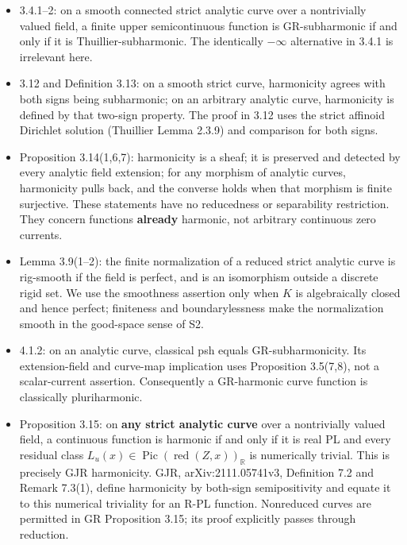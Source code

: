 \documentclass[
  11pt,
]{article}
\providecommand{\tightlist}{%
  \setlength{\itemsep}{0pt}\setlength{\parskip}{0pt}}
\begin{document}
\begin{itemize}
\tightlist
\item
  3.4.1--2: on a smooth connected strict analytic curve over a
  nontrivially valued field, a finite upper semicontinuous function is
  GR-subharmonic if and only if it is Thuillier-subharmonic. The
  identically \(-\infty\) alternative in 3.4.1 is irrelevant here.
\item
  3.12 and Definition 3.13: on a smooth strict curve, harmonicity agrees
  with both signs being subharmonic; on an arbitrary analytic curve,
  harmonicity is defined by that two-sign property. The proof in 3.12
  uses the strict affinoid Dirichlet solution (Thuillier Lemma 2.3.9)
  and comparison for both signs.
\item
  Proposition 3.14(1,6,7): harmonicity is a sheaf; it is preserved and
  detected by every analytic field extension; for any morphism of
  analytic curves, harmonicity pulls back, and the converse holds when
  that morphism is finite surjective. These statements have no
  reducedness or separability restriction. They concern functions
  \textbf{already} harmonic, not arbitrary continuous zero currents.
\item
  Lemma 3.9(1--2): the finite normalization of a reduced strict analytic
  curve is rig-smooth if the field is perfect, and is an isomorphism
  outside a discrete rigid set. We use the smoothness assertion only
  when \(K\) is algebraically closed and hence perfect; finiteness and
  boundarylessness make the normalization smooth in the good-space sense
  of S2.
\item
  4.1.2: on an analytic curve, classical psh equals GR-subharmonicity.
  Its extension-field and curve-map implication uses Proposition
  3.5(7,8), not a scalar-current assertion. Consequently a GR-harmonic
  curve function is classically pluriharmonic.
\item
  Proposition 3.15: on \textbf{any strict analytic curve} over a
  nontrivially valued field, a continuous function is harmonic if and
  only if it is real PL and every residual class
  \(L_u(x)\in\operatorname{Pic}(\operatorname{red}(Z,x))_{\mathbb R}\)
  is numerically trivial. This is precisely GJR harmonicity. GJR,
  arXiv:2111.05741v3, Definition 7.2 and Remark 7.3(1), define
  harmonicity by both-sign semipositivity and equate it to this
  numerical triviality for an R-PL function. Nonreduced curves are
  permitted in GR Proposition 3.15; its proof explicitly passes through
  reduction.
\end{itemize}
\end{document}
